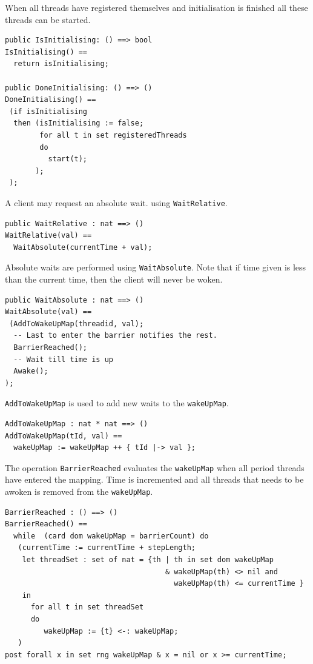\documentclass{overturerepchap}
\begin{document}
When all threads have registered themselves and initialisation is finished
all these threads can be started.

\begin{lstlisting}
public IsInitialising: () ==> bool
IsInitialising() ==
  return isInitialising;
 
public DoneInitialising: () ==> ()
DoneInitialising() ==
 (if isInitialising
  then (isInitialising := false;
        for all t in set registeredThreads 
        do
          start(t);
       );
 );
\end{lstlisting}

A client may request an absolute wait. using \texttt{WaitRelative}.

\begin{lstlisting}
public WaitRelative : nat ==> ()
WaitRelative(val) ==
  WaitAbsolute(currentTime + val);
\end{lstlisting}

Absolute waits are performed using \texttt{WaitAbsolute}. Note that if time
given is less than the current time, then the client will never be
woken.

\begin{lstlisting}
public WaitAbsolute : nat ==> ()
WaitAbsolute(val) ==
 (AddToWakeUpMap(threadid, val);
  -- Last to enter the barrier notifies the rest.
  BarrierReached();
  -- Wait till time is up
  Awake();
);
\end{lstlisting}

\texttt{AddToWakeUpMap} is used to add new waits to the \texttt{wakeUpMap}.

\begin{lstlisting}
AddToWakeUpMap : nat * nat ==> ()
AddToWakeUpMap(tId, val) ==
  wakeUpMap := wakeUpMap ++ { tId |-> val };
\end{lstlisting}

The operation \texttt{BarrierReached} evaluates the \texttt{wakeUpMap} when 
all period threads have entered the mapping. Time is incremented and all threads
that needs to be awoken is removed from the \texttt{wakeUpMap}.

\begin{lstlisting}
BarrierReached : () ==> ()
BarrierReached() == 
  while  (card dom wakeUpMap = barrierCount) do
   (currentTime := currentTime + stepLength;
    let threadSet : set of nat = {th | th in set dom wakeUpMap 
                                     & wakeUpMap(th) <> nil and 
                                       wakeUpMap(th) <= currentTime }
    in
      for all t in set threadSet 
      do
         wakeUpMap := {t} <-: wakeUpMap;
   )
post forall x in set rng wakeUpMap & x = nil or x >= currentTime;
\end{lstlisting}
\end{document}
